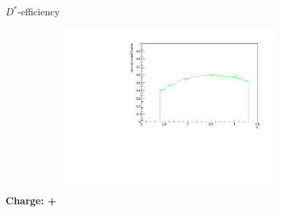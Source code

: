 \documentclass[11pt]{beamer}
\begin{document}
\begin{frame}{$D^*$-efficiency}
\begin{figure}
\begin{subfigure}{0.45\textwidth}
\end{subfigure}
\begin{subfigure}{0.45\textwidth}
\includegraphics[width=0.9\textwidth]{up_pdf/single/tot/h_eta_reco_Dst.pdf}
\end{subfigure}
\end{figure}
\end{frame}
\begin{frame}
\begin{LARGE}
\textbf{Charge: +}
\end{LARGE}
\end{frame}
\end{document}
